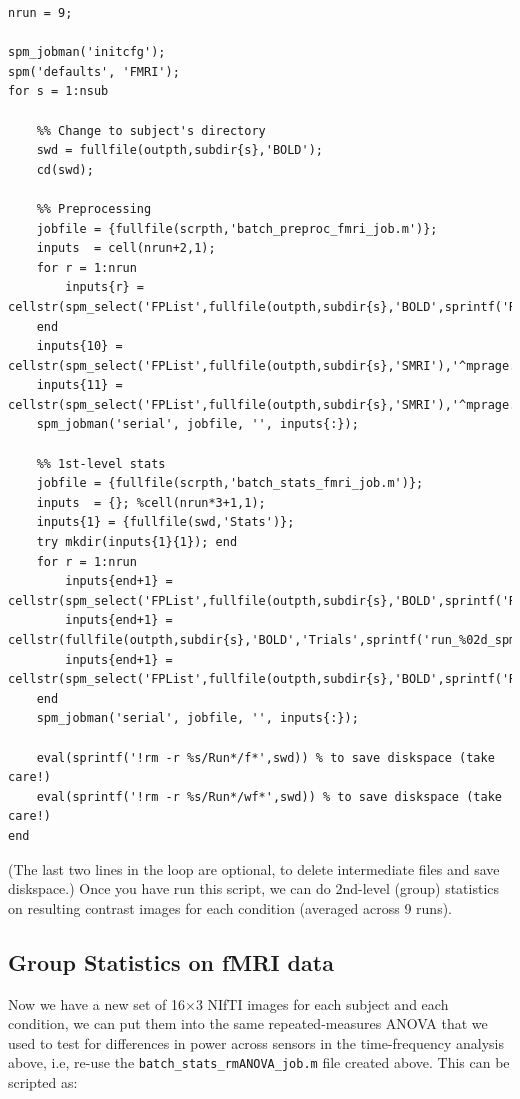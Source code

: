 \begin{lstlisting}[style=Matlab-editor,basicstyle=\mlttfamily\footnotesize]
nrun = 9;

spm_jobman('initcfg');
spm('defaults', 'FMRI');
for s = 1:nsub
    
    %% Change to subject's directory
    swd = fullfile(outpth,subdir{s},'BOLD');
    cd(swd);
    
    %% Preprocessing
    jobfile = {fullfile(scrpth,'batch_preproc_fmri_job.m')};
    inputs  = cell(nrun+2,1);
    for r = 1:nrun
        inputs{r} = cellstr(spm_select('FPList',fullfile(outpth,subdir{s},'BOLD',sprintf('Run_%02d',r)),'^fMR.*\.nii$'));
    end   
    inputs{10} = cellstr(spm_select('FPList',fullfile(outpth,subdir{s},'SMRI'),'^mprage.*\.nii$'));
    inputs{11} = cellstr(spm_select('FPList',fullfile(outpth,subdir{s},'SMRI'),'^mprage.*\.nii$'));
    spm_jobman('serial', jobfile, '', inputs{:});
    
    %% 1st-level stats
    jobfile = {fullfile(scrpth,'batch_stats_fmri_job.m')};
    inputs  = {}; %cell(nrun*3+1,1);
    inputs{1} = {fullfile(swd,'Stats')}; 
    try mkdir(inputs{1}{1}); end
    for r = 1:nrun
        inputs{end+1} = cellstr(spm_select('FPList',fullfile(outpth,subdir{s},'BOLD',sprintf('Run_%02d',r)),'^swfMR.*\.nii$'));
        inputs{end+1} = cellstr(fullfile(outpth,subdir{s},'BOLD','Trials',sprintf('run_%02d_spmdef.mat',r)));
        inputs{end+1} = cellstr(spm_select('FPList',fullfile(outpth,subdir{s},'BOLD',sprintf('Run_%02d',r)),'^rp.*\.txt$'));
    end   
    spm_jobman('serial', jobfile, '', inputs{:});

    eval(sprintf('!rm -r %s/Run*/f*',swd)) % to save diskspace (take care!)
    eval(sprintf('!rm -r %s/Run*/wf*',swd)) % to save diskspace (take care!)
end
\end{lstlisting}

(The last two lines in the loop are optional, to delete intermediate files and save diskspace.) 
Once you have run this script, we can do 2nd-level (group) statistics on resulting contrast images for each condition (averaged across 9 runs).

\subsection{Group Statistics on fMRI data}

Now we have a new set of 16\(\times\)3 NIfTI images for each subject and each condition, we can put them into the same repeated-measures ANOVA that we used to test for differences in power across sensors in the time-frequency analysis above, i.e, re-use the \texttt{batch\_stats\_rmANOVA\_job.m} file created above. This can be scripted as:

